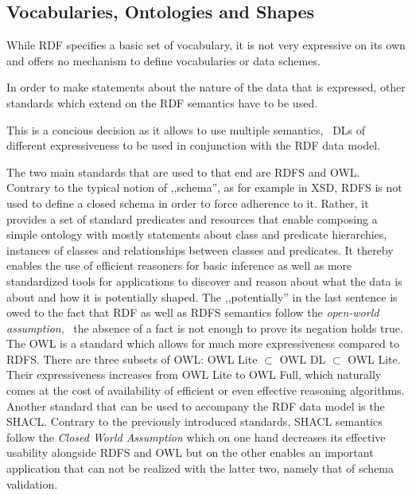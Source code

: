 \subsection{Vocabularies, Ontologies and Shapes}
\label{ssec:onto}
While \ac{RDF} specifies a basic set of vocabulary, it is not very expressive on its own and offers no mechanism to define vocabularies or data schemes.

In order to make statements about the nature of the data that is expressed, other standards which extend on the \ac{RDF} semantics have to be used.

This is a concious decision as it allows to use multiple semantics, \ie~\acp{DL} of different expressiveness to be used in conjunction with the \ac{RDF} data model.

The two main standards that are used to that end are \ac{RDFS} and \ac{OWL}.\\

Contrary to the typical notion of ,,schema'', as for example in \ac{XSD}, \ac{RDFS} is not used to define a closed schema in order to force adherence to it.
Rather, it provides a set of standard predicates and resources that enable composing a simple ontology with mostly statements about class and predicate hierarchies, instances of classes and relationships between classes and predicates.
It thereby enables the use of efficient reasoners for basic inference as well as more standardized tools for applications to discover and reason about what the data is about and how it is potentially shaped.
The ,,potentially'' in the last sentence is owed to the fact that \ac{RDF} as well as \ac{RDFS} semantics follow the \emph{open-world assumption}, \ie~the absence of a fact is not enough to prove its negation holds true.\\

The \acl{OWL} is a standard which allows for much more expressiveness compared to \ac{RDFS}.
There are three subsets of \ac{OWL}: \ac{OWL} Lite $\subset$ \ac{OWL} DL $\subset$ \ac{OWL} Lite.
Their expressiveness increases from \ac{OWL} Lite to \ac{OWL} Full, which naturally comes at the cost of availability of efficient or even effective reasoning algorithms.\\

Another standard that can be used to accompany the \ac{RDF} data model is the \acf{SHACL}.
Contrary to the previously introduced standards, \ac{SHACL} semantics follow the \emph{Closed World Assumption} which on one hand decreases its effective usability alongside \ac{RDFS} and \ac{OWL} but on the other enables an important application that can not be realized with the latter two, namely that of schema validation.

